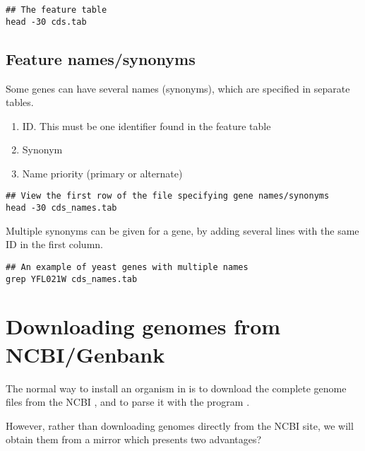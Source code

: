 \begin{footnotesize}
\begin{verbatim}
## The feature table
head -30 cds.tab
\end{verbatim}
\end{footnotesize}


\subsection{Feature names/synonyms}

Some genes can have several names (synonyms), which are specified in
separate tables.

\begin{enumerate}
\item ID. This must be one identifier found in the feature table
\item Synonym
\item Name priority (primary or alternate)
\end{enumerate}


\begin{footnotesize}
\begin{verbatim}
## View the first row of the file specifying gene names/synonyms
head -30 cds_names.tab
\end{verbatim}
\end{footnotesize}


Multiple synonyms can be given for a gene, by adding several lines with
the same ID in the first column.

\begin{footnotesize}
\begin{verbatim}
## An example of yeast genes with multiple names
grep YFL021W cds_names.tab 
\end{verbatim}
\end{footnotesize}



\section{Downloading genomes from NCBI/Genbank}

The normal way to install an organism in \RSAT is to download the
complete genome files from the NCBI
, and to parse it with the
program .

However, rather than downloading genomes directly from the NCBI site,
we will obtain them from a mirror
 which presents two
advantages?

